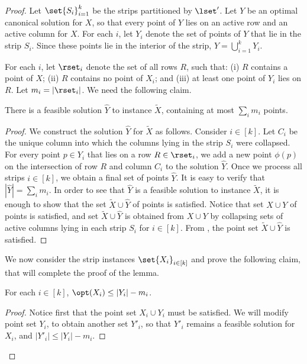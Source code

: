 \documentclass{toc}
\begin{document}
\begin{proof}        

Let $\set{S_i}_{i=1}^k$ be the strips partitioned by $\lset'$. 
Let $Y$ be an optimal canonical solution for $X$, so that every point of $Y$ lies on an active row and an active column for $X$. For each $i$, let $Y_i$ denote the set of points of $Y$ that lie in the strip $S_i$. Since these points  lie in the interior of the strip,  $Y = \bigcup_{i=1}^k Y_i$. 
        
        
        For each $i$, let $\rset_i$ denote the set of all rows $R$, such that: (i) $R$ contains a point of $X$; (ii) $R$ contains no point of $X_i$; and (iii) at least one point of $Y_i$ lies on $R$. Let $m_i=|\rset_i|$.
      We need the following claim.
         
        \begin{claim}
                There is a feasible solution $\hat{Y}$ to instance $\tilde{X}$, containing at most $\sum_{i} m_i$ points. 
        \end{claim}
        \begin{proof}
                We construct the solution $\hat{Y}$ for $\tilde{X}$ as follows. 
                Consider $i \in [k]$. Let $C_i$ be the unique column into which the columns lying in the strip $S_i$ were collapsed. For every point $p\in Y_i$ that lies on a row $R\in\rset_i$, we add a new point $\phi(p)$ on the intersection of row $R$ and column $C_i$ to the solution $\hat Y$. Once we process all strips $i \in [k]$, we obtain a final set of points $\hat Y$. It is easy to verify that  $|\hat{Y}| = \sum_i m_i$. 
In order to see that $\hat Y$ is a feasible solution to instance $\tilde{X}$, it is enough to show that the set $\tilde{X}\cup \hat Y$ of points is satisfied. 
Notice that set $X\cup Y$ of points is satisfied, and set $\tilde{X}\cup \hat Y$ is obtained from $X\cup Y$ by collapsing sets of active columns lying in each strip $S_i$ for $i \in [k]$. 
From , the point set $\tilde{X}\cup \hat Y$ is satisfied.  
\end{proof}
        
        We now consider the strip instances $\set{X_i}_{i\in [k]}$ and prove the following claim, that will complete the proof of the lemma. 
        
        \begin{claim}\label{claim:opt y-m}
                For each $i \in [k]$, $\opt(X_i) \leq |Y_i| - m_i$. 
        \end{claim}
       \begin{proof}
                Notice first that the point set $X_i \cup Y_i$ must be satisfied. 
                We will modify point set $Y_i$, to obtain another set $Y'_i$, so that $Y'_i$ remains a feasible solution for $X_i$, and $|Y'_i| \le |Y_i| - m_i$.
                

\end{proof}
\end{proof}
\end{document}
